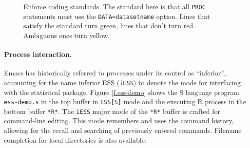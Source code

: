 \documentclass{article}
\def\url#1{\stexttt{#1}} %
\newcommand{\stexttt}[1]{{\small\texttt{#1}}}
\begin{document}
\begin{figure}[tbp]
  \caption{Enforce coding standards.  The standard here is
    that all \stexttt{PROC} statements must use the
    \stexttt{DATA=datasetname} option.  Lines that satisfy the
    standard turn green, lines that don't turn red.
    Ambiguous ones turn yellow.}
  \label{f.hilock}
\end{figure}

\paragraph{Process interaction.}
Emacs has historically referred to processes under its control as
``inferior'', accounting for the name inferior ESS (\stexttt{iESS}) to
denote the mode for interfacing with the statistical package.  Figure
\ref{f.ess-demo} shows the S language program \stexttt{ess-demo.s} in
the top buffer in \stexttt{ESS[S]} mode and the executing R process in
the bottom buffer \stexttt{*R*}.  The \stexttt{iESS} major mode of the
\stexttt{*R*} buffer is crafted for command-line editing.  This mode
remembers and uses the command history, allowing for the recall and
searching of previously entered commands.  Filename completion for
local directories is also available.
\end{document}

